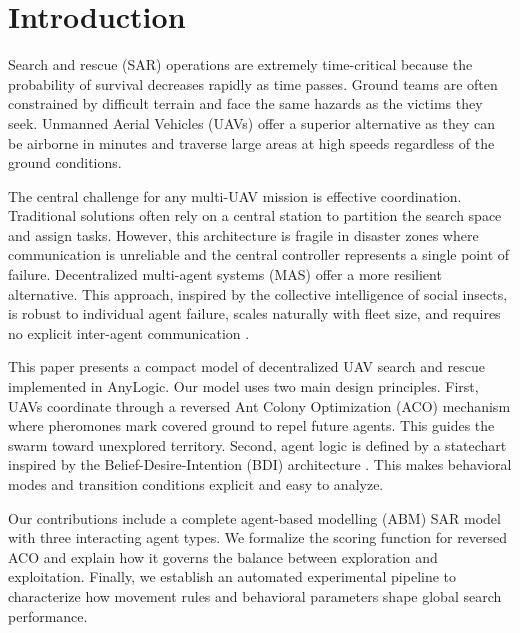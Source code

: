 \section{Introduction}

Search and rescue (SAR) operations are extremely time-critical because the probability of survival decreases rapidly as time passes. Ground teams are often constrained by difficult terrain and face the same hazards as the victims they seek. Unmanned Aerial Vehicles (UAVs) offer a superior alternative as they can be airborne in minutes and traverse large areas at high speeds regardless of the ground conditions.

The central challenge for any multi-UAV mission is effective coordination. Traditional solutions often rely on a central station to partition the search space and assign tasks. However, this architecture is fragile in disaster zones where communication is unreliable and the central controller represents a single point of failure. Decentralized multi-agent systems (MAS) offer a more resilient alternative. This approach, inspired by the collective intelligence of social insects, is robust to individual agent failure, scales naturally with fleet size, and requires no explicit inter-agent communication \citep{bk:Bonabeau1999}.

This paper presents a compact model of decentralized UAV search and rescue implemented in AnyLogic. Our model uses two main design principles. First, UAVs coordinate through a reversed Ant Colony Optimization (ACO) mechanism where pheromones mark covered ground to repel future agents. This guides the swarm toward unexplored territory. Second, agent logic is defined by a statechart inspired by the Belief-Desire-Intention (BDI) architecture \citep{bk:Bratman1987,inpr:RaoGeorgeff1991}. This makes behavioral modes and transition conditions explicit and easy to analyze.

Our contributions include a complete agent-based modelling (ABM) SAR model with three interacting agent types. We formalize the scoring function for reversed ACO and explain how it governs the balance between exploration and exploitation. Finally, we establish an automated experimental pipeline to characterize how movement rules and behavioral parameters shape global search performance.

